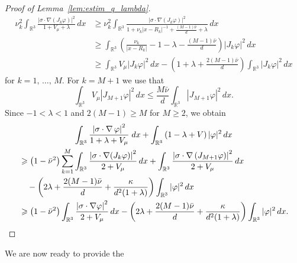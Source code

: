 \documentclass[AHL,Unicode,published]{cedram}
\newcommand{\R}{\mathbb{R}}
\newcommand\1{{\ensuremath {\mathds 1} }}
\renewcommand\phi{\varphi}
\renewcommand{\geq}{\geqslant}
\begin{document}
\begin{proof}[Proof of Lemma~\ref{lem:estim_q_lambda}]
\begin{equation}
\begin{aligned}
\nu_k^2\int_{\R^3}\frac{\left|\sigma\cdot \nabla (J_k\phi)\right|^2}{1+V_\mu+\lambda}\,dx &\geq \nu_k^2\int_{\R^3}\frac{\left|\sigma\cdot \nabla(J_k\phi)\right|^2}{1+\nu_k\left|x-R_k\right|^{-1}+\frac{(M-1)\bar\nu}{d}+\lambda}\,dx\\
&\geq \int_{\R^3}\left(\frac{\nu_k}{\left|x-R_k\right|}-1-\lambda-\frac{(M-1)\bar\nu}{d}\right)\left|J_k\phi\right|^2\,dx\\
&\geq \int_{\R^3}V_\mu\left|J_k\phi\right|^2\,dx-\left(1+\lambda+\frac{2(M-1)\bar\nu}{d}\right)\int_{\R^3}\left|J_k\phi\right|^2\,dx
\end{aligned}
\end{equation}
for $k=1,\,\dots,\,M$. For $k=M+1$ we use that
\[
\int_{\R^3}V_\mu\left|J_{M+1}\phi\right|^2\,dx \le \frac{M\bar\nu}{d} \int_{\R^3}\left|J_{M+1}\phi\right|^2\,dx.
\]
Since $-1<\lambda<1$ and $2(M-1)\geq M$ for $M\geq2$, we obtain
\begin{multline}\label{eq:estim_q_lambda}
\int_{\R^3}\frac{\left|\sigma\cdot\nabla\,\phi\right|^2}{1+\lambda+V_\mu}\;dx +\int_{\R^3}\left(1-\lambda+V\right)|\phi|^2\,dx\\
\begin{aligned}
& \geq\left(1-\bar\nu^2\right)\sum_{k=1}^M\int_{\R^3}\frac{\left|\sigma\cdot \nabla (J_k\phi)\right|^2}{2+V_\mu}\,dx+\int_{\R^3}\frac{\left|\sigma\cdot \nabla \left(J_{M+1}\phi\right)\right|^2}{2+V_\mu}\,dx\\
& \quad-\left(2\lambda+\frac{2(M-1)\bar\nu}{d}+\frac{\kappa}{d^2(1+\lambda)}\right)\int_{\R^3}|\phi|^2\,dx\\
& \geq\left(1-\bar\nu^2\right)\int_{\R^3}\frac{\left|\sigma\cdot \nabla \phi\right|^2}{2+V_\mu}\,dx-\left(2\lambda+\frac{2(M-1)\bar\nu}{d}+\frac{\kappa}{d^2(1+\lambda)}\right)\int_{\R^3}|\phi|^2\,dx.\qedhere
\end{aligned}
\end{multline}
\end{proof}

\goodbreak
We are now ready to provide the
\end{document}
